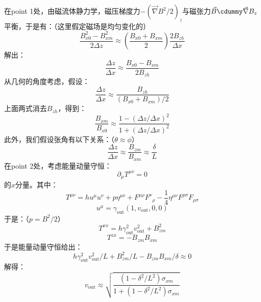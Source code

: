 \documentclass[lang=cn,color=blue,cm,11pt,scheme=chinese,bibend=bibtex,sorting=nty]{elegantbook}
\begin{document}
	在point 1处，由磁流体静力学，磁压梯度力$- (\vec{\nabla} B^2 / 2)_z$与磁张力$\vec{B} \cdummy \vec{\nabla} B_z$平衡，于是有：（这里假定磁场是均匀变化的）
	\begin{equation}
		\frac{B_{x 0}^2 - B^2_{x m}}{2 \Delta z} \approx \left( \frac{B_{x 0} + B_{x m}}{2} \right) \frac{2 B_{z h}}{\Delta x}
	\end{equation}
	解出：
	\begin{equation}
		\frac{\Delta z}{\Delta x} \approx \frac{B_{x 0} - B_{x m}}{2 B_{z h}}
	\end{equation}
	从几何的角度考虑，假设：
	\begin{equation}
		\frac{\Delta z}{\Delta x} \approx \frac{B_{z h}}{(B_{x 0} + B_{x m}) / 2}
	\end{equation}
	上面两式消去$B_{z h}$，得到：
	\begin{equation}
		\frac{B_{x m}}{B_{x 0}} \approx \frac{1 - (\Delta z / \Delta x)^2}{1 + (\Delta z / \Delta x)^2}
	\end{equation}
	此外，我们假设张角有以下关系：（$\theta \approx \phi$）
	\begin{equation}
		\frac{\Delta z}{\Delta x} \approx \frac{B_{z m}}{B_{x m}} \approx \frac{\delta}{L}
	\end{equation}
	在point 2处，考虑能量动量守恒：
	\begin{equation}
		\partial_{\mu} T^{\mu \nu} = 0
	\end{equation}
	的$x$分量。其中：
	\begin{equation}
		T^{\mu \nu} = h u^{\mu} u^{\nu} + p \eta^{\mu \nu} + F^{\mu \rho} F^{\nu}{}_{\rho} - \frac{1}{4} \eta^{\mu \nu} F^{\rho \sigma} F_{\rho \sigma}
	\end{equation}
	\begin{equation}
		u^{\mu} = \gamma_{\text{out}} (1, v_{\text{out}}, 0, 0)
	\end{equation}
	于是：（$p = B^2 / 2$）
	\begin{equation}
		T^{x x} = h \gamma_{\text{out}}^2 v_{\text{out}}^2 + B^2_{z m}
	\end{equation}
	\begin{equation}
		T^{z x} = - B_{z m} B_{x m}
	\end{equation}
	于是能量动量守恒给出：
	\begin{equation}
		h \gamma_{\text{out}}^2 v_{\text{out}}^2 / L + B^2_{z m} / L - B_{z m} B_{x m} / \delta \approx 0
	\end{equation}
	解得：
	\begin{equation}
		v_{\text{out}} \approx \sqrt{\frac{(1 - \delta^2 / L^2) \sigma_{x m}}{1 + (1 - \delta^2 / L^2) \sigma_{x m}}}
	\end{equation}
\end{document}
